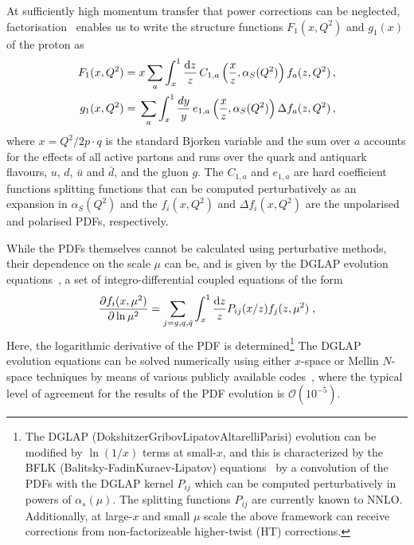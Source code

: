 At sufficiently high momentum transfer that power corrections can be neglected, factorisation~\cite{Sterman:1995fz} enables us to write the structure functions $F_1(x,Q^2)$ and $g_1(x)$ of the proton as 
\begin{align}
F_1(x,Q^2) = {} & x\sum_a \int_x^1 \frac{{\rm d}z}{z}\,C_{1,a}\left(\frac{x}{z},\alpha_S(Q^2)\right)f_a(z,Q^2) \,, \label{eq:Fi}\\
g_1(x,Q^2) = {} & \sum_a \int_x^1\frac{dy}{y}\, e_{1,a}\left(\frac{x}{z},\alpha_S(Q^2)\right) \Delta f_a(z,Q^2) \,,
\label{pdf}
\end{align}
where $x=Q^2/2p\cdot q$ is the standard Bjorken variable and the sum over $a$ accounts for the effects of all active partons and runs over the quark and antiquark flavours, $u$, $d$, $\bar{u}$ and $\bar{d}$, and the gluon $g$. The $C_{1,a}$ and $e_{1,a}$ are hard coefficient functions splitting functions that can be computed perturbatively as an expansion in $\alpha_S(Q^2)$ and the $f_i(x,Q^2)$ and $\Delta f_i(x,Q^2)$ are the unpolarised and polarised PDFs, respectively.

While the PDFs themselves cannot be calculated using perturbative methods, their dependence on the scale $\mu$ can be, and is given by the  
DGLAP evolution equations~\cite{Dokshitzer:1977sg,Gribov:1972ri,Altarelli:1977zs},
a set of integro-differential coupled equations of the form
\begin{equation}
  \label{eq:dglap}
\frac{\partial f_i(x,\mu^2)}{\partial \ln \mu^2}=\sum_{j=g,q,\bar{q}}\int_x^1 \frac{{\rm d}z}{z}P_{ij}(x/z)f_j(z,\mu^2)\;,
\end{equation}
Here, the logarithmic derivative of the PDF is
determined\footnote{The DGLAP (Dokshitzer\textendash Gribov\textendash Lipatov\textendash Altarelli\textendash Parisi)
evolution can be modified by $\ln(1/x)$ terms at small-$x$, and
this is characterized by the BFLK (Balitsky-FadinKuraev-Lipatov) equations~\cite{Kuraev:1976ge,Kuraev:1977fs,Balitsky:1978ic} by a convolution
of the PDFs with the DGLAP kernel $P_{ij}$ which can be computed
perturbatively in powers of $\alpha_{s}(\mu)$.
%
The splitting functions $P_{ij}$ are currently known to NNLO.
%
Additionally, at large-$x$ and small $\mu$ scale the above framework
can receive corrections from non-factorizeable higher-twist (HT) corrections.}
%
The DGLAP evolution equations can be solved numerically using
either $x$-space or Mellin $N$-space techniques by means of various
publicly available
codes~\cite{Bertone:2013vaa,Salam:2008qg,Botje:2010ay}, where the typical level of agreement
for the results of the PDF evolution is $\mathcal{O}(10^{-5})$.

